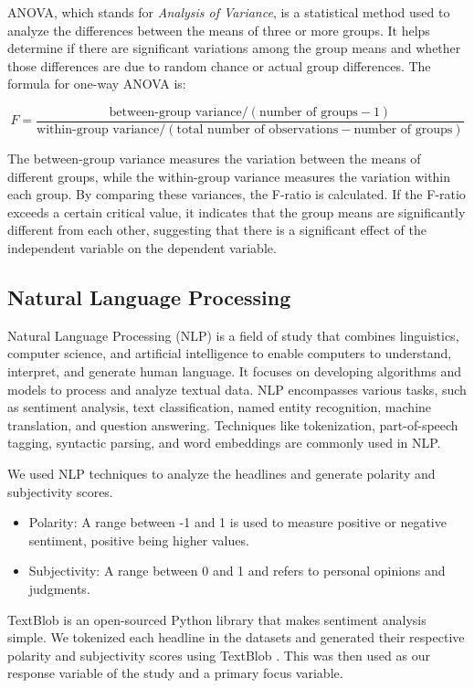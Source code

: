 \documentclass[12pt]{article}
\begin{document}
ANOVA, which stands for \textit{Analysis of Variance}, is a statistical method used to analyze the differences between the means of three or more groups. It helps determine if there are significant variations among the group means and whether those differences are due to random chance or actual group differences. The formula for one-way ANOVA is:

\[
F = \frac{{\text{{between-group variance}} / (\text{{number of groups}} - 1)}}{{\text{{within-group variance}} / (\text{{total number of observations}} - \text{{number of groups}})}}
\]

The between-group variance measures the variation between the means of different groups, while the within-group variance measures the variation within each group. By comparing these variances, the F-ratio is calculated. If the F-ratio exceeds a certain critical value, it indicates that the group means are significantly different from each other, suggesting that there is a significant effect of the independent variable on the dependent variable.


\subsection{Natural Language Processing}

Natural Language Processing (NLP) is a field of study that combines linguistics, computer science, and artificial intelligence to enable computers to understand, interpret, and generate human language. It focuses on developing algorithms and models to process and analyze textual data. NLP encompasses various tasks, such as sentiment analysis, text classification, named entity recognition, machine translation, and question answering. Techniques like tokenization, part-of-speech tagging, syntactic parsing, and word embeddings are commonly used in NLP.

We used NLP techniques to analyze the headlines and generate polarity and subjectivity scores.
\begin{itemize}
    \item Polarity: A range between -1 and 1 is used to measure positive or negative sentiment, positive being higher values.
    \item Subjectivity: A range between 0 and 1 and refers to personal opinions and judgments.
\end{itemize}

TextBlob is an open-sourced Python library that makes sentiment analysis simple. We tokenized each headline in the datasets and generated their respective polarity and subjectivity scores using TextBlob \cite{loria2018}. This was then used as our response variable of the study and a primary focus variable.
\end{document}
